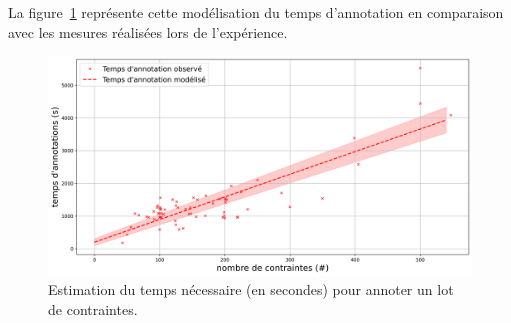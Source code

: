 			La figure~\ref{figure:4.3.1-ETUDE-COUTS-TEMPS-ANNOTATION-SIMULATION} représente cette modélisation du temps d'annotation en comparaison avec les mesures réalisées lors de l'expérience.
			\begin{figure}[!htb]
				\centering
				\includegraphics[width=\textwidth]{figures/etude-temps-annotation-1-modelisation-temps}
				\caption{Estimation du temps nécessaire (en secondes) pour annoter un lot de contraintes.}
				\label{figure:4.3.1-ETUDE-COUTS-TEMPS-ANNOTATION-SIMULATION}
			\end{figure}
		
		
